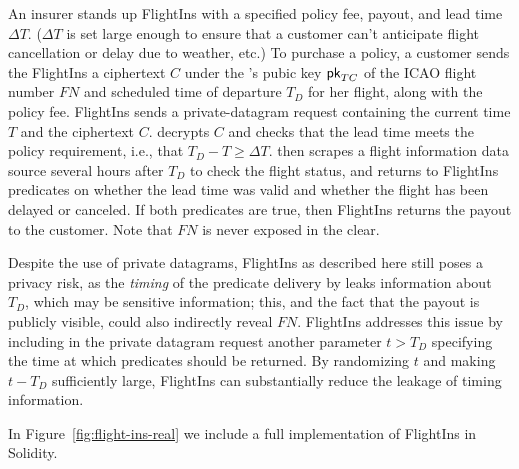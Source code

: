An insurer stands up {\sf FlightIns} with a specified policy fee, payout, and lead time $\Delta T$. ($\Delta T$ is set large enough to ensure that a customer can't anticipate flight cancellation or delay due to weather, etc.) To purchase a policy, a customer sends the {\sf FlightIns} a ciphertext  $C$ under the \tc's pubic key ${\sf pk}_{TC}$ of the ICAO flight number $FN$ and scheduled time of departure $T_D$ for her flight, along with the policy fee. {\sf FlightIns} sends \tc a private-datagram request containing the current time $T$ and the ciphertext $C$. \tc decrypts $C$ and checks that the lead time meets the policy requirement, i.e., that $T_D - T \geq \Delta T$. \tc then scrapes a flight information data source several hours after $T_D$ to check the flight status, and returns to {\sf FlightIns} predicates on whether the lead time was valid and whether the flight has been delayed or canceled. If both predicates are true, then {\sf FlightIns} returns the payout to the customer. Note that $FN$ is never exposed in the clear.

Despite the use of private datagrams, {\sf FlightIns} as described here still poses a privacy risk, as the {\em timing} of the predicate delivery by \tc leaks information about $T_D$, which may be sensitive information; this, and the fact that the payout is publicly visible, could also indirectly reveal $FN$. {\sf FlightIns} addresses this issue by including in the private datagram request another parameter $t > T_D$ specifying the time at which predicates should be returned. By randomizing $t$ and making $t - T_D$ sufficiently large, {\sf FlightIns} can substantially reduce the leakage of timing information. 

In Figure~\ref{fig:flight-ins-real} we include a full implementation of {\sf FlightIns} in Solidity.

\begin{figure*}[p!]
  \centering
  
  \caption{Solidity code for the {\sf FlightIns} application contract.}
  \label{fig:flight-ins-real}
\end{figure*}


